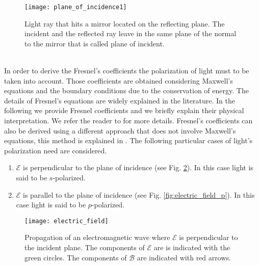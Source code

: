 \begin{figure}[h]
 \label{fig:planeofincidence}
     \begin{center}
     \texttt{[image: plane\_of\_incidence1]}
     \end{center}
     \caption{Light ray that hits a mirror located on the reflecting plane. The incident and the reflected ray leave in the same plane of the normal to the mirror that is called plane of incident.}
\label{fig:planeofincidence}
 \end{figure}
\\ \indent In order to derive the Fresnel's coefficients the polarization of light must to be taken into account.
Those coefficients are obtained considering Maxwell's equations and the boundary conditions due to the conservation of energy.
The details of Fresnel's equations are widely explained in the literature. 
In the following we provide Fresnel coefficients and we briefly explain their physical interpretation. We refer the reader to \cite{born2013principles, hecht1998hecht} for more details. 
Fresnel's coefficients can also be derived using a different approach that does not involve Maxwell's equations, this method is explained in \cite{feynman2011feynman}.  
The following particular cases of light's polarization need are considered. 
\begin{enumerate}
\item $\boldsymbol{\mathcal{E}}$ is perpendicular to the plane of incidence (see Fig. \ref{fig:electric_field}). In this case light is said to be $s$-polarized.
\item $\boldsymbol{\mathcal{E}}$ is parallel to the plane of incidence (see Fig. \ref{fig:electric_field_p}). In this case light is said to be $p$-polarized.
\end{enumerate}
\begin{figure}[h]
 \label{fig:electric_field}
     \begin{center}
     \texttt{[image: electric\_field]}
     \end{center}
     \caption{Propagation of an electromagnetic wave where $\boldsymbol{\mathcal{E}}$ is perpendicular to the incident plane. The components of $\boldsymbol{\mathcal{E}}$ are is indicated with the green circles.
The components of $\boldsymbol{\mathcal{B}}$ are indicated with red arrows.}
\label{fig:electric_field}
 \end{figure}
